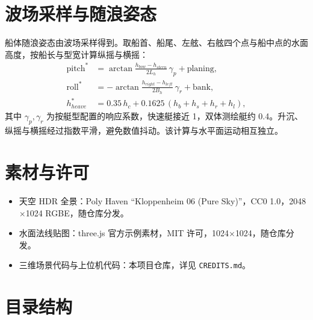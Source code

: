 \documentclass[UTF8, a4paper, 11pt]{ctexart}
\newcommand{\file}[1]{\texttt{#1}}
\begin{document}
\section{波场采样与随浪姿态}

船体随浪姿态由波场采样得到。取船首、船尾、左舷、右舷四个点与船中点的水面高度，按船长与型宽计算纵摇与横摇：
\begin{equation}
\begin{aligned}
\text{pitch}^{\ast} &= \arctan\frac{h_{bow}-h_{stern}}{2L_h}\,\gamma_p + \text{planing},\\
\text{roll}^{\ast} &= -\arctan\frac{h_{right}-h_{left}}{2B_h}\,\gamma_r + \text{bank},\\
h_{heave}^{\ast} &= 0.35\,h_c + 0.1625\,(h_b+h_s+h_r+h_l),
\end{aligned}
\label{eq:attitude}
\end{equation}
其中 $\gamma_p,\gamma_r$ 为按艇型配置的响应系数，快速艇接近 1，双体测绘艇约 0.4。升沉、纵摇与横摇经过指数平滑，避免数值抖动。该计算与水平面运动相互独立。

\section{素材与许可}

\begin{itemize}
  \item 天空 HDR 全景：Poly Haven “Kloppenheim 06 (Pure Sky)”，CC0 1.0，2048$\times$1024 RGBE，随仓库分发。
  \item 水面法线贴图：three.js 官方示例素材，MIT 许可，1024$\times$1024，随仓库分发。
  \item 三维场景代码与上位机代码：本项目仓库，详见 \file{CREDITS.md}。
\end{itemize}

\section{目录结构}
\end{document}
